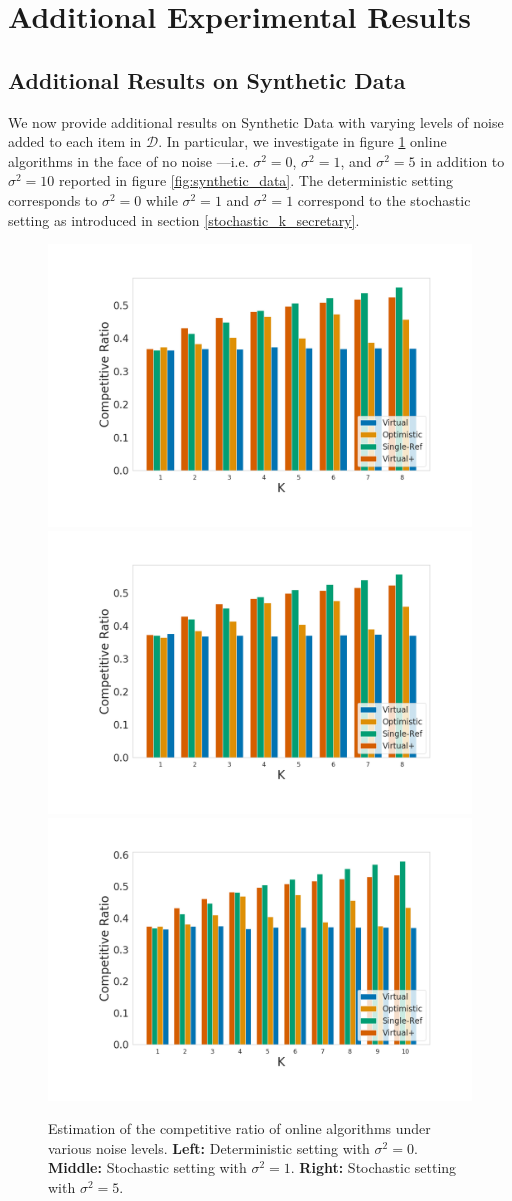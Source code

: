 \clearpage
\section{Additional Experimental Results}
\label{appendix:additional_results}

\subsection{Additional Results on Synthetic Data}
\label{appendix:synthetic_additional_results}
We now provide additional results on Synthetic Data with varying levels of noise added to each item in $\mathcal{D}$. In particular, we investigate in figure \ref{fig:additional_results_synthetic_data} online algorithms in the face of no noise ---i.e. $\sigma^2 = 0$, $\sigma^2 = 1$, and $\sigma^2 = 5$ in addition to $\sigma^2 = 10$ reported in figure \ref{fig:synthetic_data}. The deterministic setting corresponds to $\sigma^2 = 0$ while $\sigma^2=1$ and $\sigma^2=1$ correspond to the stochastic setting as introduced in section \ref{stochastic_k_secretary}.

\begin{figure}[ht]
    \centering
    \includegraphics[width=0.32\linewidth]{Figures/Competitive_RatioBar8-Deterministic.png}
    \includegraphics[width=0.32\linewidth]{Figures/Competitive_RatioBar8-Var-1.png}
    \includegraphics[width=0.32\linewidth]{Figures/Competitive_RatioBar-Var-5.png}
    \caption{Estimation of the competitive ratio of online algorithms under various noise levels. \textbf{Left:} Deterministic setting with $\sigma^2=0$. \textbf{Middle:} Stochastic setting with $\sigma^2 = 1$. \textbf{Right:} Stochastic setting with $\sigma^2 = 5$.}
    \label{fig:additional_results_synthetic_data}
\end{figure}




